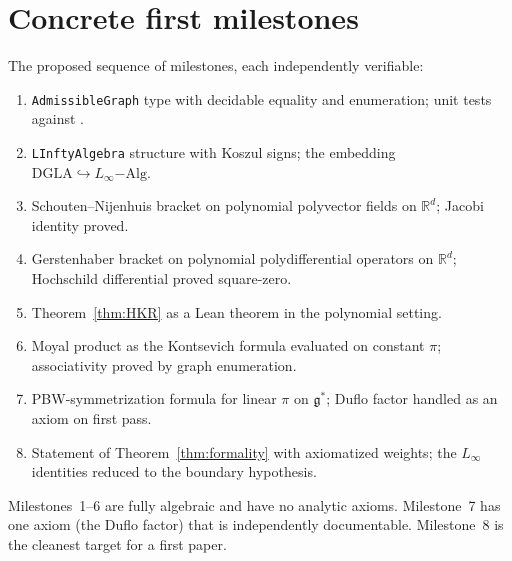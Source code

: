 \documentclass[11pt,a4paper]{article}
\theoremstyle{definition}
\newcommand{\R}{\mathbb{R}}
\begin{document}
\section{Concrete first milestones}\label{sec:milestones}

The proposed sequence of milestones, each independently verifiable:
\begin{enumerate}[leftmargin=2em]
  \item \texttt{AdmissibleGraph} type with decidable equality and
        enumeration; unit tests against \cite[\S6.1]{Kontsevich2003}.
  \item \texttt{LInftyAlgebra} structure with Koszul signs; the
        embedding $\mathrm{DGLA} \hookrightarrow L_\infty\mathrm{-Alg}$.
  \item Schouten--Nijenhuis bracket on polynomial polyvector fields on
        $\R^{d}$; Jacobi identity proved.
  \item Gerstenhaber bracket on polynomial polydifferential operators
        on $\R^{d}$; Hochschild differential proved square-zero.
  \item Theorem~\ref{thm:HKR} as a Lean theorem in the polynomial
        setting.
  \item Moyal product as the Kontsevich formula evaluated on constant
        $\pi$; associativity proved by graph enumeration.
  \item PBW-symmetrization formula for linear $\pi$ on
        $\mathfrak{g}^{*}$; Duflo factor handled as an axiom on first
        pass.
  \item Statement of Theorem~\ref{thm:formality} with axiomatized
        weights; the $L_\infty$ identities reduced to the boundary
        hypothesis.
\end{enumerate}

Milestones~1--6 are fully algebraic and have no analytic axioms.
Milestone~7 has one axiom (the Duflo factor) that is independently
documentable. Milestone~8 is the cleanest target for a first paper.
\end{document}
